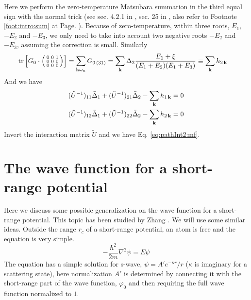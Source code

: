 Here we perform the zero-temperature Matsubara summation  in the third equal sign with the normal trick (see sec. 4.2.1 in \cite{Altland}, sec. 25 in \cite{Fetter}, also refer to Footnote \ref{foot:intro:sum} at Page. \pageref{foot:intro:sum}). Because of zero-temperature,  within three roots, $E_{1}$, $-E_{2}$ and $-E_{3}$, we only need to take into account two negative roots $-E_{2}$ and $-E_{3}$, assuming the correction is small. 
Similarly
\begin{equation}
\begin{split}
\text{tr}\left[{G_{0}}\cdot\left(\begin{smallmatrix}0&0&1\\0&0&0\\0&0&0\end{smallmatrix}\right)\right]&=\sum_{\mathbf{k}\omega_{n}}G_{0\,(31)}
=\sum_{\mathbf{k}}\Delta_{2}\frac{E_{1}+\xi}{(E_{1}+E_{2})(E_{1}+E_{3})}\equiv\sum_{\mathbf{k}}h_{2\,\mathbf{k}}
\end{split}
\end{equation}
And we have 
 \begin{align*}
(\tilde{U}^{-1})_{11}\bar{\Delta}_{1}+(\tilde{U}^{-1})_{21}\bar{\Delta}_{2}-\sum_{\mathbf{k}}h_{1\,\mathbf{k}}=0\\
(\tilde{U}^{-1})_{12}\bar{\Delta}_{1}+(\tilde{U}^{-1})_{22}\bar{\Delta}_{2}-\sum_{\mathbf{k}}h_{2\,\mathbf{k}}=0
 \end{align*}
Invert the interaction matrix $\tilde{U}$ and we have Eq.  \ref{eq:pathInt2:mf}.


\section{The wave function for a short-range potential}\label{sec:pathInt2:short-range}
Here we discuss some possible generalization on the wave function for a short-range potential.  This topic has been studied by Zhang \cite{shizhongUniv}. We will use some similar ideas.  Outside the range $r_{c}$ of a short-range potential,  an atom is free and  the  \sch equation is very simple.
\begin{equation}
-\frac{\hbar^{2}}{2m}\nabla^{2}\psi=E\psi
\end{equation}
The equation has a simple solution for s-wave, $\psi=A'{e^{-\kappa{r}}}/{r}$ ($\kappa$ is imaginary for a scattering state), here normalization $A'$ is determined  by connecting it with the short-range part of the wave function, $\varphi_0$ and then requiring the full wave function normalized to $1$. 

